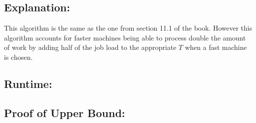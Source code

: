 \documentclass[11pt]{article}
\begin{document}
\subsection*{Explanation:}
This algorithm is the same as the one from section 11.1 of the book.
However this algorithm accounts for faster machines being able to process double the amount of work
by adding half of the job load to the appropriate $T$ when a fast machine is chosen.

\subsection*{Runtime:}

\subsection*{Proof of Upper Bound:}
\end{document}
